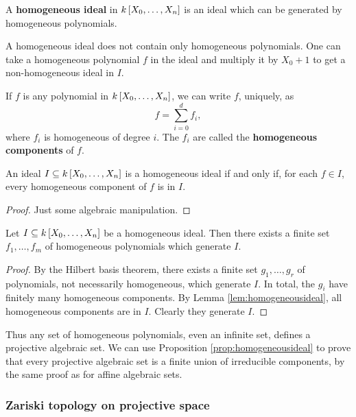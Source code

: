 \begin{definition*}
A \textbf{homogeneous ideal} in $ k\sbr{X_0, \dots, X_n} $ is an ideal which can be generated by homogeneous polynomials.
\end{definition*}

\begin{note*}
A homogeneous ideal does not contain only homogeneous polynomials. One can take a homogeneous polynomial $ f $ in the ideal and multiply it by $ X_0 + 1 $ to get a non-homogeneous ideal in $ I $.
\end{note*}

If $ f $ is any polynomial in $ k\sbr{X_0, \dots, X_n} $, we can write $ f $, uniquely, as
$$ f = \sum_{i = 0}^d f_i, $$
where $ f_i $ is homogeneous of degree $ i $. The $ f_i $ are called the \textbf{homogeneous components} of $ f $.

\begin{lemma}
\label{lem:homogeneousideal}
An ideal $ I \subseteq k\sbr{X_0, \dots, X_n} $ is a homogeneous ideal if and only if, for each $ f \in I $, every homogeneous component of $ f $ is in $ I $.
\end{lemma}

\begin{proof}
Just some algebraic manipulation.
\end{proof}

\begin{proposition}
\label{prop:homogeneousideal}
Let $ I \subseteq k\sbr{X_0, \dots, X_n} $ be a homogeneous ideal. Then there exists a finite set $ f_1, \dots, f_m $ of homogeneous polynomials which generate $ I $.
\end{proposition}

\begin{proof}
By the Hilbert basis theorem, there exists a finite set $ g_1, \dots, g_r $ of polynomials, not necessarily homogeneous, which generate $ I $. In total, the $ g_i $ have finitely many homogeneous components. By Lemma \ref{lem:homogeneousideal}, all homogeneous components are in $ I $. Clearly they generate $ I $.
\end{proof}

Thus any set of homogeneous polynomials, even an infinite set, defines a projective algebraic set. We can use Proposition \ref{prop:homogeneousideal} to prove that every projective algebraic set is a finite union of irreducible components, by the same proof as for affine algebraic sets.

\subsubsection{Zariski topology on projective space}

